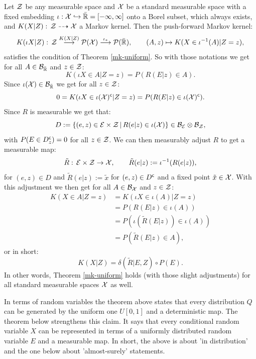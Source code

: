 \begin{Rem}
    \label{rem:R-to-std-ms}
    Let $\mathcal{Z}$ be any measurable space and $\mathcal{X}$ be a standard measurable space with a fixed embedding $\iota: \mathcal{X} \hookrightarrow \bar{\mathbb{R}}=[-\infty,\infty]$ onto a Borel subset, which always exists, and $K(X|Z) :\, \mathcal{Z} \dasharrow \mathcal{X}$ a Markov kernel. Then the push-forward Markov kernel:
    \[K(\iota X|Z) :\, \mathcal{Z} \stackrel{K(X|Z)}{\longrightarrow} \mathcal{P}(\mathcal{X}) \stackrel{\iota_*}{\longrightarrow} \mathcal{P}(\bar{\mathbb{R}}), \qquad (A,z) \mapsto K( X \in \iota^{-1}(A) |Z=z),  \]
    satisfies the condition of Theorem \ref{mk-uniform}. So with those notations we get for all $A \in \mathcal{B}_{\bar{\mathbb{R}}}$ and $z \in \mathcal{Z}$:
\[ K(\iota X \in A|Z=z) = P(R(E|z) \in A).  \]
Since $\iota(\mathcal{X}) \in \mathcal{B}_{\bar {\mathbb{R}}}$ we get for all $z \in \mathcal{Z}$:
\[ 0=K(\iota X \in \iota(\mathcal{X})^{\mathsf{c}}|Z=z) = P(R(E|z) \in \iota(\mathcal{X})^{\mathsf{c}}).  \]
Since $R$ is measurable we get that:
\[ D := \left \{ (e,z) \in \mathcal{E} \times \mathcal{Z} \,\middle|\, R(e|z) \in \iota(\mathcal{X}) \right \} \in \mathcal{B}_{\mathcal{E}} \otimes \mathcal{B}_{\mathcal{Z}},\]
with $P(E \in D_z^{\mathsf{c}}) =0$ for all $z \in \mathcal{Z}$. We can then measurably adjust $R$ to get a measurable map:
\[ \tilde R:\, \mathcal{E} \times \mathcal{Z} \to \mathcal{X}, \qquad \tilde R(e|z) := \iota^{-1}(R(e|z)),\]
for $(e,z) \in D$ and $\tilde R(e|z) := \tilde x$ for $(e,z) \in D^{\mathsf{c}}$ and a fixed point $\tilde x \in \mathcal{X}$.
With this adjustment we then get for all $A \in \mathcal{B}_{\mathcal{X}}$ and $z \in \mathcal{Z}$:
\begin{align*} K(X \in A|Z=z) &= K(\iota X \in \iota(A)|Z=z) \\
&= P( R(E|z) \in \iota(A)) \\
&= P(\iota(\tilde R(E|z)) \in \iota(A)) \\
&= P(\tilde R(E|z) \in A), 
\end{align*}
or in short:
\[ K(X|Z) = \delta(\tilde R|E,Z) \circ P(E).\]
In other words, Theorem \ref{mk-uniform} holds (with those slight adjustments) for all standard measurable spaces $\mathcal{X}$ as well.
\end{Rem}

In terms of random variables the theorem above states that every distribution $Q$ can be generated by the uniform one $U[0,1]$ and a deterministic map. The theorem below strengthens this claim. It says that every conditional random variable $X$ can be represented in terms of a 
uniformly distributed random variable $E$ and a measurable map. In short, the above is about 'in distribution' and the one below about 'almost-surely' statements.

